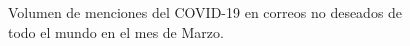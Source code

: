 \begin{figure}[h!]
\begin{center}
{}
\end{center}
\caption{Volumen de menciones del COVID-19 en correos no deseados de todo el mundo en el mes de Marzo.}
\label{fig:imsoph}
\end{figure}

